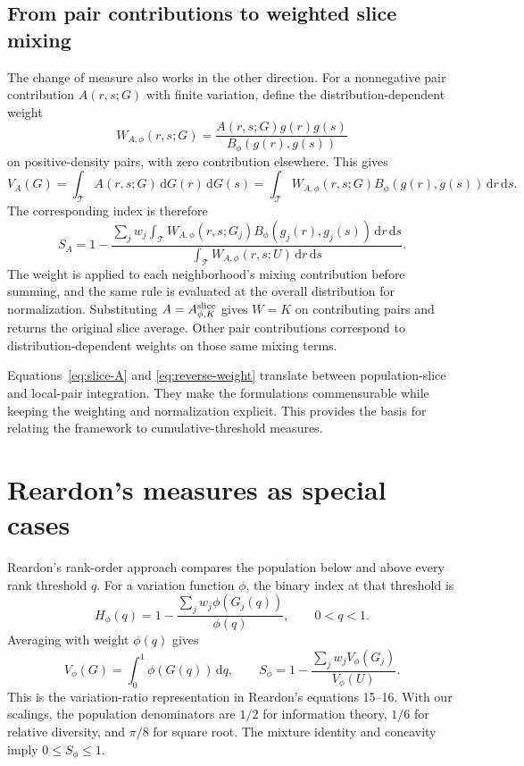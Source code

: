 \documentclass[11pt]{article}
\newcommand{\dd}{\,\mathrm{d}}
\newcommand{\T}{\mathcal{T}}
\begin{document}
\subsection{From pair contributions to weighted slice mixing}

The change of measure also works in the other direction. For a nonnegative pair contribution $A(r,s;G)$ with finite variation, define the distribution-dependent weight
\begin{equation}
W_{A,\phi}(r,s;G)
=\frac{A(r,s;G)g(r)g(s)}{B_\phi(g(r),g(s))}
\label{eq:reverse-weight}
\end{equation}
on positive-density pairs, with zero contribution elsewhere. This gives
\begin{equation}
V_A(G)=\int_{\T}A(r,s;G)\dd G(r)\dd G(s)
=\int_{\T}W_{A,\phi}(r,s;G)B_\phi(g(r),g(s))\dd r\dd s.
\label{eq:reverse}
\end{equation}
The corresponding index is therefore
\begin{equation}
S_A=1-
\frac{\sum_jw_j\int_{\T}W_{A,\phi}(r,s;G_j)B_\phi(g_j(r),g_j(s))\dd r\dd s}
{\int_{\T}W_{A,\phi}(r,s;U)\dd r\dd s}.
\label{eq:weighted-mixing}
\end{equation}
The weight is applied to each neighborhood's mixing contribution before summing, and the same rule is evaluated at the overall distribution for normalization. Substituting $A=A^{\rm slice}_{\phi,K}$ gives $W=K$ on contributing pairs and returns the original slice average. Other pair contributions correspond to distribution-dependent weights on those same mixing terms.

Equations~\eqref{eq:slice-A} and \eqref{eq:reverse-weight} translate between population-slice and local-pair integration. They make the formulations commensurable while keeping the weighting and normalization explicit. This provides the basis for relating the framework to cumulative-threshold measures.

\section{Reardon's measures as special cases}
\label{sec:reardon}

Reardon's rank-order approach \citep{reardon2011} compares the population below and above every rank threshold $q$. For a variation function $\phi$, the binary index at that threshold is
\[
H_\phi(q)=1-\frac{\sum_jw_j\phi(G_j(q))}{\phi(q)},\qquad 0<q<1.
\]
Averaging with weight $\phi(q)$ gives
\begin{equation}
V_\phi(G)=\int_0^1\phi(G(q))\dd q,\qquad
S_\phi=1-\frac{\sum_jw_jV_\phi(G_j)}{V_\phi(U)}.
\label{eq:baseline}
\end{equation}
This is the variation-ratio representation in Reardon's equations 15--16. With our scalings, the population denominators are $1/2$ for information theory, $1/6$ for relative diversity, and $\pi/8$ for square root. The mixture identity and concavity imply $0\leq S_\phi\leq1$.
\end{document}
